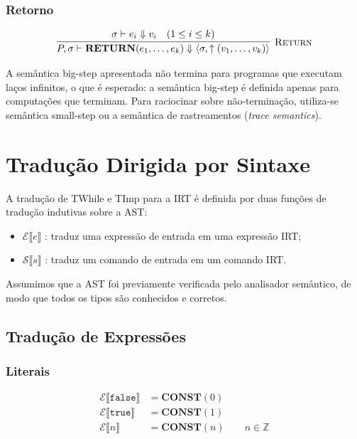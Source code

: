 \subsubsection*{Retorno}

\[
  \infer[\textsc{Return}]
  {P, \sigma \vdash \mathbf{RETURN}(e_1, \ldots, e_k)
  \Downarrow \langle \sigma, \uparrow (v_1, \ldots, v_k) \rangle}
  {\sigma \vdash e_i \Downarrow v_i \quad (1 \leq i \leq k)}
\]

\begin{remark}
  A semântica big-step apresentada não termina para programas que executam
  laços infinitos, o que é esperado: a semântica big-step é definida apenas
  para computações que terminam.  Para raciocinar sobre não-terminação,
  utiliza-se semântica small-step ou a semântica de rastreamentos
  (\emph{trace semantics}).
\end{remark}

\section{Tradução Dirigida por Sintaxe}\label{sec:irt-sdt}

A tradução de TWhile e TImp para a IRT é definida por duas funções de
tradução indutivas sobre a AST:

\begin{itemize}
  \item $\mathcal{E}\llbracket e \rrbracket$ : traduz uma expressão
    de entrada em
    uma expressão IRT;
  \item $\mathcal{S}\llbracket s \rrbracket$ : traduz um comando de
    entrada em um
    comando IRT.
\end{itemize}

Assumimos que a AST foi previamente verificada pelo analisador semântico, de
modo que todos os tipos são conhecidos e corretos.

\subsection{Tradução de Expressões}\label{sec:sdt-expr}

\subsubsection*{Literais}

\begin{align*}
  \mathcal{E}\llbracket \mathtt{false} \rrbracket &= \mathbf{CONST}(0) \\
  \mathcal{E}\llbracket \mathtt{true}  \rrbracket &= \mathbf{CONST}(1) \\
  \mathcal{E}\llbracket n \rrbracket              &= \mathbf{CONST}(n)
  \qquad n \in \mathbb{Z}
\end{align*}

